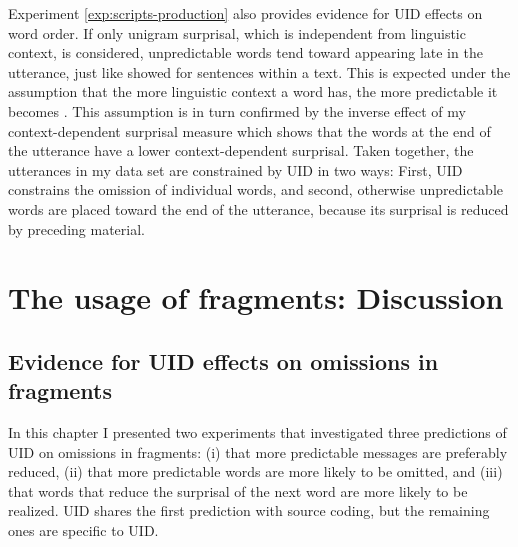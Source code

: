 Experiment \ref{exp:scripts-production} also provides evidence for UID effects on word order. If only unigram surprisal, which is independent from linguistic context, is considered, unpredictable words tend toward appearing late in the utterance, just like \citet{genzel.charniak2002} showed for sentences within a text. This is expected under the assumption that the more linguistic context a word has, the more predictable it becomes \citep{genzel.charniak2002, levy2008}. This assumption is in turn confirmed by the inverse effect of my context-dependent surprisal measure which shows that the words at the end of the utterance have a lower context-dependent surprisal. Taken together, the utterances in my data set are constrained by UID in two ways: First, UID constrains the omission of individual words, and second, otherwise unpredictable words are placed toward the end of the utterance, because its surprisal is reduced by preceding material.

\section{The usage of fragments: Discussion}
\label{sec:scripts-discussion}

\subsection{Evidence for UID effects on omissions in fragments}
In this chapter I presented two experiments that investigated three predictions of UID on omissions in fragments: (i) that more predictable messages are preferably reduced, (ii) that more predictable words are more likely to be omitted, and (iii) that words that reduce the surprisal of the next word are more likely to be realized. UID shares the first prediction with source coding, but the remaining ones are specific to UID.

